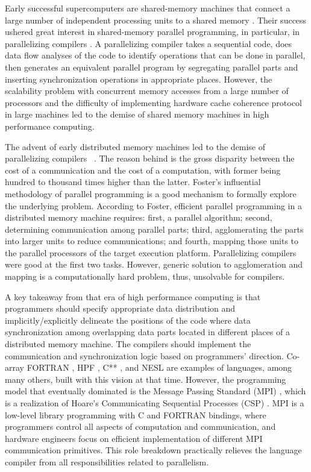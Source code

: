 \documentclass[ASNA,twocolumn]{USG} %
\begin{document}
{Early successful supercomputers are shared-memory machines that connect a large number of independent processing units to a shared memory \citep{10.5555/1623264.1623335} \citep{10.1145/1480083.1480098} \citep{hord1982illiac}. Their success ushered great interest in shared-memory parallel programming, in particular, in parallelizing compilers \citep{10.1145/234313.234417}\citep{10.1145/193209.193217}. A parallelizing compiler takes a sequential code, does data flow analyses of the code to identify operations that can be done in parallel, then generates an equivalent parallel program by segregating parallel parts and inserting synchronization operations in appropriate places. However, the scalability problem with concurrent memory accesses from a large number of processors and the difficulty of implementing hardware cache coherence protocol in large machines led to the demise of shared memory machines in high performance computing.
	
The advent of early distributed memory machines {\color{red}led to the demise of} parallelizing compilers ~\citep{10.1145/1238844.1238851}. The reason behind is the gross disparity between the cost of a communication and the cost of a computation, with former being hundred to thousand times higher than the latter. Foster's influential methodology of parallel programming \citep{Foster:1995:DBP:527029} is a good mechanism to formally explore the underlying problem. According to Foster, efficient parallel programming in a distributed memory machine requires: first, a parallel algorithm; second, determining communication among parallel parts; third, agglomerating the parts into larger units to reduce communications; and fourth, mapping those units to the parallel processors of the target execution platform. Parallelizing compilers were good at the first two tasks. However, generic solution to agglomeration and mapping is a computationally hard problem, thus, unsolvable for compilers.  
	
A key takeaway from that era of high performance computing is that programmers should specify appropriate data distribution and implicitly/explicitly delineate the positions of the code where data synchronization among overlapping data parts located in different places of a distributed memory machine. The compilers should implement the communication and synchronization logic based on programmers' direction. Co-array FORTRAN \citep{10.1145/289918.289920}, HPF \citep{219857} \citep{MEHROTRA1998325}, C** \citep{10.1007/3-540-57502-2_56}, and NESL \citep{10.5555/865114} are examples of languages, among many others, built with this vision at that time. However, the programming model that eventually dominated is the Message Passing Standard (MPI) \citep{10.1007/978-3-0348-8534-8_21}, which is a realization of Hoare's Communicating Sequential Processes (CSP) \citep{10.1145/359576.359585}. MPI is a low-level library programming with C and FORTRAN bindings, where programmers control all aspects of computation and communication, and hardware engineers focus on efficient implementation of different MPI communication primitives. This role breakdown practically relieves the language compiler from all responsibilities related to parallelism. 
	
}
\end{document}

